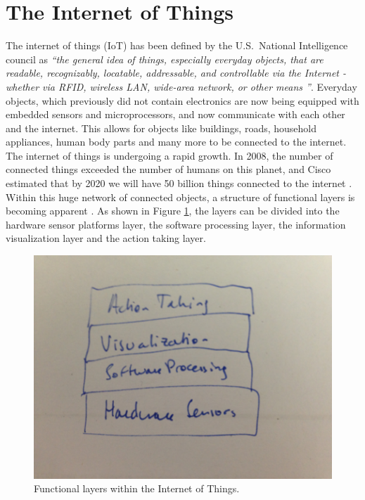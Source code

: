 \section{The Internet of Things}
\label{sec:internetOfThings}
The internet of things (IoT) has been defined by the U.S.\ National Intelligence council as \emph{``the general idea of things, especially everyday objects, that are readable, recognizably, locatable, addressable, and controllable via the Internet - whether via RFID, wireless LAN, wide-area network, or other means \cite{disruptiveTechnologies}''}.
Everyday objects, which previously did not contain electronics are now being equipped with embedded sensors and microprocessors, and now communicate with each other and the internet. 
This allows for objects like buildings, roads, household appliances, human body parts and many more to be connected to the internet. 
The internet of things is undergoing a rapid growth. 
In 2008, the number of connected things exceeded the number of humans on this planet, and Cisco estimated that by 2020 we will have 50 billion things connected to the internet \cite{evans12} . 
Within this huge network of connected objects, a structure of functional layers is becoming apparent \cite{swan12}. 
As shown in Figure \ref{fig:functionalLayers}, the layers can be divided into the hardware sensor platforms layer, the software processing layer, the information visualization layer and the action taking layer.
\begin{figure}[!t]
\centering
\includegraphics[width=0.9\columnwidth]{Images/functionalLayers}
\caption{Functional layers within the Internet of Things.}
\label{fig:functionalLayers}
\end{figure}

